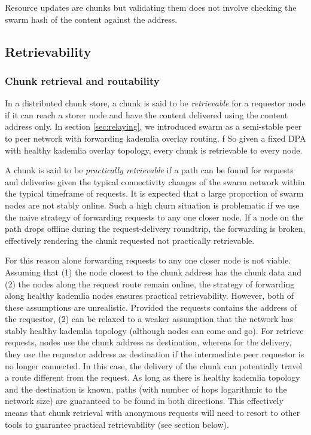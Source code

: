 Resource updates are chunks but validating them does not involve checking the swarm hash of the content against the address. 

\subsection{Retrievability}


\subsubsection{Chunk retrieval and routability}

In a distributed chunk store, a chunk is said to be \emph{retrievable} for a  requestor node if it can reach a storer node and have the content delivered using the content address only.
In section \ref{sec:relaying}, we introduced swarm as a semi-stable peer to peer network with forwarding kademlia overlay routing. f    
So given a fixed DPA with healthy kademlia overlay topology, every chunk  is retrievable to every node.

A chunk is said to be \emph{practically retrievable} if a path can be found for requests and deliveries given the typical connectivity changes of the swarm network within the typical timeframe of requests. 
It is expected that a large proportion of swarm nodes are not stably online. Such a high churn situation is problematic if we use the naive strategy of forwarding requests to any one closer node. If a node on the path drops offline during the request-delivery roundtrip, the forwarding is broken, effectively rendering the chunk requested not practically retrievable. 

For this reason alone forwarding requests to any one closer node is not viable. Assuming that (1) the node closest to the chunk address has the chunk data and (2) the nodes along the request route remain online, the strategy of forwarding along healthy kademlia nodes ensures practical retrievability.
However, both of these assumptions are unrealistic. Provided the requests contains the address of the requestor, (2) can be relaxed to a weaker assumption that the network has stably healthy kademlia topology (although nodes can come and go). For retrieve requests, nodes use the chunk address as destination, whereas  for the delivery, they use the requestor address as destination if the intermediate peer requestor is no longer connected. 
In this case, the delivery of the chunk can potentially travel a  route different from the request. As long as there is healthy kademlia topology and the destination is known, paths (with number of hops logarithmic to the network size) are guaranteed to be found in both directions. 
This effectively means that chunk retrieval with anonymous requests will need to resort to other tools to guarantee practical retrievability (see section below). 



